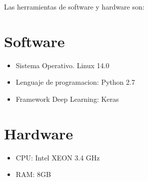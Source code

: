 Las herramientas de software y hardware son:

\section{Software}
\begin{itemize}
 \item Sistema Operativo. Linux 14.0
 \item Lenguaje de programacion: Python 2.7
 \item Framework Deep Learning: Keras
\end{itemize}

\section{Hardware}
\begin{itemize}
 \item CPU: Intel XEON 3.4 GHz
 \item RAM: 8GB
\end{itemize}
